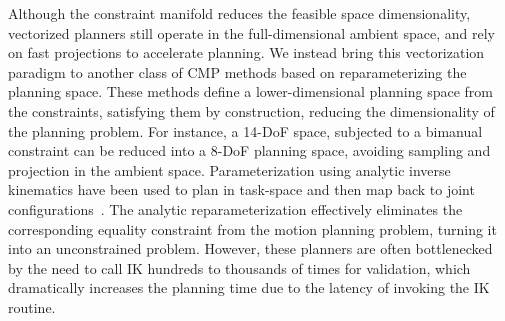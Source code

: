 \documentclass[letterpaper, 10 pt, conference]{ieeeconf}
\begin{document}
Although the constraint manifold reduces the feasible space dimensionality, vectorized planners still operate in the full-dimensional ambient space, and rely on fast projections to accelerate  planning. We instead bring this vectorization paradigm to another class of CMP methods based on reparameterizing the planning space. These methods define a lower-dimensional planning space from the constraints, satisfying them by construction, reducing the dimensionality of the planning problem. For instance, a 14-DoF space, subjected to a bimanual constraint can be reduced into a 8-DoF planning space, avoiding sampling and projection in the ambient space. Parameterization using analytic inverse kinematics have been used to plan in task-space and then map back to joint configurations~\cite{cohn2024constrained}. 
The analytic reparameterization effectively eliminates the corresponding equality constraint from the motion planning problem, turning it into an unconstrained problem. However, these planners are often bottlenecked by the need to call IK hundreds to thousands of times for validation, which dramatically increases the planning time due to the latency of invoking the IK routine.
\end{document}
